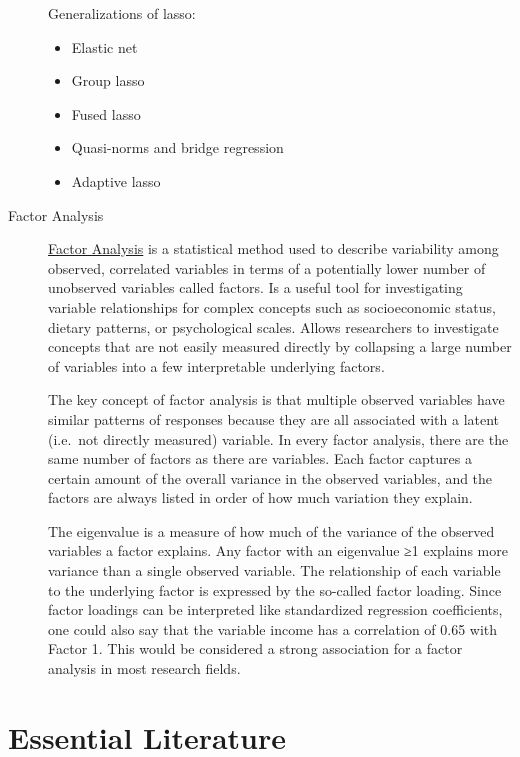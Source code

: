 \documentclass[
]{book}
\begin{document}
\begin{description}
Generalizations of lasso:

\begin{itemize}
\item
  Elastic net
\item
  Group lasso
\item
  Fused lasso
\item
  Quasi-norms and bridge regression
\item
  Adaptive lasso
\end{itemize}
\item[Factor Analysis]
\href{https://www.theanalysisfactor.com/factor-analysis-1-introduction/}{Factor Analysis} is a statistical method used to describe variability among observed, correlated variables in terms of a potentially lower number of unobserved variables called factors. Is a useful tool for investigating variable relationships for complex concepts such as socioeconomic status, dietary patterns, or psychological scales. Allows researchers to investigate concepts that are not easily measured directly by collapsing a large number of variables into a few interpretable underlying factors.

The key concept of factor analysis is that multiple observed variables have similar patterns of responses because they are all associated with a latent (i.e.~not directly measured) variable. In every factor analysis, there are the same number of factors as there are variables. Each factor captures a certain amount of the overall variance in the observed variables, and the factors are always listed in order of how much variation they explain.

The eigenvalue is a measure of how much of the variance of the observed variables a factor explains. Any factor with an eigenvalue ≥1 explains more variance than a single observed variable. The relationship of each variable to the underlying factor is expressed by the so-called factor loading. Since factor loadings can be interpreted like standardized regression coefficients, one could also say that the variable income has a correlation of 0.65 with Factor 1. This would be considered a strong association for a factor analysis in most research fields.
\end{description}

\hypertarget{appendix-appendix}{%
\appendix}


\hypertarget{essential-literature}{%
\chapter{Essential Literature}\label{essential-literature}}
\end{document}
